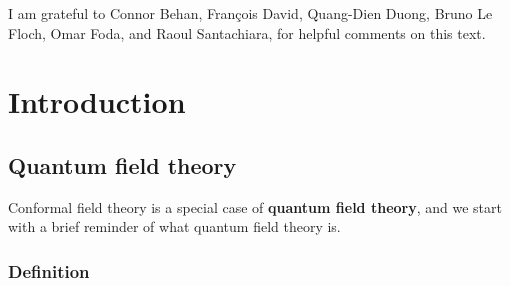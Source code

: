 \documentclass[12pt, a4paper, notitlepage, twoside]{report}
\numberwithin{equation}{section}
\theoremstyle{break}
\begin{document}
I am grateful to Connor Behan, Fran\c{c}ois David, Quang-Dien Duong, Bruno Le Floch, Omar Foda, and Raoul Santachiara, for helpful comments on this text.

\chapter{Introduction \label{secintr}}

\section{Quantum field theory \label{secqft} }

Conformal field theory is a special case of \textbf{\boldmath quantum field theory}, and we start with a brief reminder of what quantum field theory is.

\subsection{Definition} 
\end{document}
